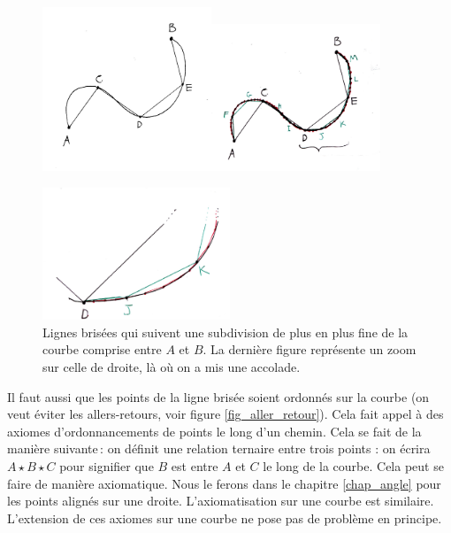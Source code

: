 	\begin{figure}
		\includegraphics[width=0.45\textwidth]{image/pi_nombre/courbe2.jpg}\includegraphics[width=0.45\textwidth]{image/pi_nombre/courbe3.jpg}

		\includegraphics[width=0.5\textwidth]{image/pi_nombre/courbe4.jpg}
		
		\caption{Lignes brisées qui suivent une subdivision de plus en plus fine de la courbe comprise entre $A$ et $B$. La dernière figure représente un zoom sur celle de droite, là où on a mis une accolade.} \label{fig_ligne_brisee}
	\end{figure}

	Il faut aussi que les points de la ligne brisée soient ordonnés sur la courbe (on veut éviter les allers-retours, voir figure \ref{fig_aller_retour}). Cela fait appel à des axiomes d'ordonnancements de points le long d'un chemin. Cela se fait de la manière suivante\,: on définit une relation ternaire entre trois points : on écrira $A\star B\star C$ pour signifier que $B$ est entre $A$ et $C$ le long de la courbe. Cela peut se faire de manière axiomatique. Nous le ferons dans le chapitre \ref{chap_angle} pour les points alignés sur une droite. L'axiomatisation sur une courbe est similaire. L'extension de ces axiomes sur une courbe ne pose pas de problème en principe.

